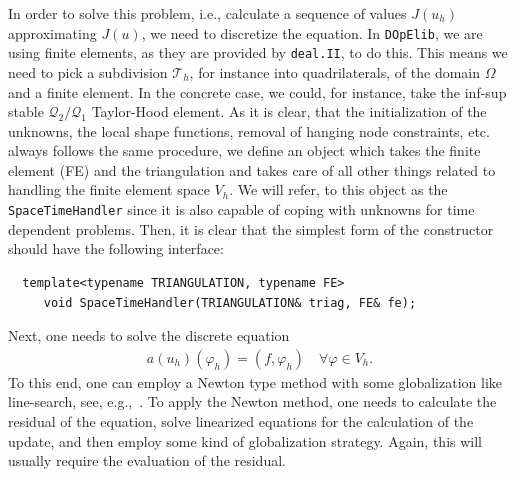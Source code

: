 \documentclass[smallextended]{svjour3}       %
\numberwithin{equation}{section}
\renewcommand{\phi}{\varphi}
\newcommand{\deal}{\texttt{deal.II}}
\newcommand{\dope}{\texttt{DOpElib}}
\begin{document}
In order to solve this problem, i.e., calculate a sequence of values $J(u_h)$ approximating $J(u)$,
we need to discretize 
the equation. In \dope, we are using finite elements, as they are 
provided by \deal{}, to do this. This means we need to pick a 
subdivision $\mathcal T_h$, for instance into quadrilaterals,
of the domain $\Omega$ and a finite element. In the concrete case, we could, 
for instance, take the inf-sup stable  $\mathcal Q_2/\mathcal Q_1$ 
Taylor-Hood element.
As it is clear, that the initialization of the unknowns, the local shape 
functions, removal of hanging node constraints, etc. always follows the 
same procedure, we define an object which takes the finite element (FE)
and the triangulation and takes care of all other things related to
handling the finite element space $V_h$. We will refer, to 
this object as the \texttt{SpaceTimeHandler} since it is also 
capable of coping with unknowns for time dependent problems. Then, it is 
clear that the simplest 
form of the constructor should have the following interface:
\begin{lstlisting}
  template<typename TRIANGULATION, typename FE>
     void SpaceTimeHandler(TRIANGULATION& triag, FE& fe);
\end{lstlisting}
Next, one needs to solve the discrete equation
\begin{align}\label{eq:discrete_equation}
a(u_h)(\phi_h) = (f,\phi_h) \quad \forall \phi \in V_h.
\end{align}
To this end, one can employ a Newton type method with some globalization 
like line-search, see, e.g.,~\cite{NoWr00}. 
To apply the Newton method, one needs to calculate the residual of the 
equation, solve linearized equations for the calculation of 
the update, and then employ some kind of globalization strategy.
Again, this will usually require the evaluation of the residual.
\end{document}
